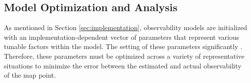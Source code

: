 \subsection{Model Optimization and Analysis}

As mentioned in Section \ref{sec:implementation}, observability models are initialized with an implementation-dependent vector of parameters that represent various tunable factors within the model. The setting of these parameters significantly . Therefore, these parameters must be optimized across a variety of representative situations to minimize the error between the estimated and actual observability of the map point. 

\subsubsection{}
